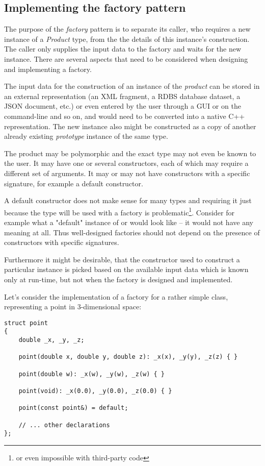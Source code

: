 \subsection{Implementing the factory pattern}

The purpose of the \emph{factory} pattern is to separate its caller,
who requires a new instance of a \emph{Product} type, from the the details
of this instance's construction. The caller only supplies the input data
to the factory and waits for the new instance. There are several aspects
that need to be considered when designing and implementing a factory.

The input data for the construction of an instance of the \emph{product}
can be stored in an external representation (an XML fragment, a RDBS database dataset,
a JSON document, etc.) or even entered by the user through a GUI or on the command-line and so on,
and would need to be converted into a native C++ representation.
The new instance also might be constructed as a copy of another already existing
\emph{prototype} instance of the same type.

The product may be polymorphic and the exact type may not even be
known to the user. It may have one or several constructors, each of which
may require a different set of arguments. It may or may not have
constructors with a specific signature, for example a default constructor.

A default constructor does not make sense for many types and requiring it
just because the type will be used with a factory is problematic\footnote{
or even impossible with third-party code}.
Consider for example what a "default" instance of \verb@person@ or \verb@address@ would
look like -- it would not have any meaning at all.
Thus well-designed factories should not depend on the presence of constructors
with specific signatures.

Furthermore it might be desirable, that the constructor used to construct
a particular instance is picked based on the available input data which is known
only at run-time, but not when the factory is designed and implemented.

Let's consider the implementation of a factory for a rather simple \verb@point@ class,
representing a point in 3-dimensional space:

\begin{verbatim}
struct point
{
    double _x, _y, _z;

    point(double x, double y, double z): _x(x), _y(y), _z(z) { }

    point(double w): _x(w), _y(w), _z(w) { }

    point(void): _x(0.0), _y(0.0), _z(0.0) { }

    point(const point&) = default;

    // ... other declarations
};
\end{verbatim}

